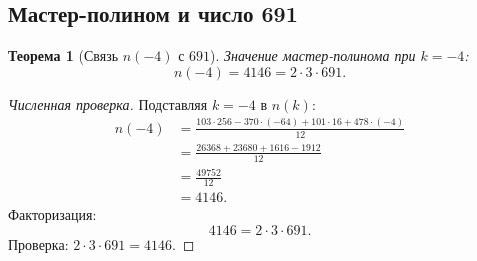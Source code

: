 \documentclass[11pt,a4paper]{article}
\newtheorem{theorem}{Теорема}[section]
\theoremstyle{definition}
\begin{document}
\subsection{Мастер-полином и число 691}
\label{subsec:master-691}

\begin{theorem}[Связь $n(-4)$ с $691$]
\label{thm:n-minus-4-691}
Значение мастер-полинома при $k = -4$:
\begin{equation}
    \boxed{
    n(-4) = 4146 = 2 \cdot 3 \cdot 691.
    }
    \label{eq:n-minus-4}
\end{equation}
\end{theorem}

\begin{proof}[Численная проверка]
Подставляя $k = -4$ в $n(k)$:
\begin{align}
    n(-4) &= \frac{103 \cdot 256 - 370 \cdot (-64) 
    + 101 \cdot 16 + 478 \cdot (-4)}{12} \\
          &= \frac{26368 + 23680 + 1616 - 1912}{12} \\
          &= \frac{49752}{12} \\
          &= 4146.
\end{align}
Факторизация:
\begin{equation}
    4146 = 2 \cdot 3 \cdot 691.
\end{equation}
Проверка: $2 \cdot 3 \cdot 691 = 4146$. \checkmark
\end{proof}
\end{document}
